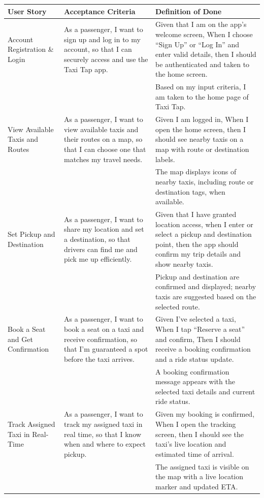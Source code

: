 \documentclass[a4paper,12pt]{article}
\begin{document}
\begin{longtable}{|p{4cm}|p{6cm}|p{5cm}|}
\hline
\textbf{User Story} & \textbf{Acceptance Criteria} & \textbf{Definition of Done} \\
\hline
Account Registration \& Login & As a passenger, I want to sign up and log in to my account, so that I can securely access and use the Taxi Tap app. & Given that I am on the app’s welcome screen, When I choose “Sign Up” or “Log In” and enter valid details, then I should be authenticated and taken to the home screen. \\
& & Based on my input criteria, I am taken to the home page of Taxi Tap. \\
\hline
View Available Taxis and Routes & As a passenger, I want to view available taxis and their routes on a map, so that I can choose one that matches my travel needs. & Given I am logged in, When I open the home screen, then I should see nearby taxis on a map with route or destination labels. \\
& & The map displays icons of nearby taxis, including route or destination tags, when available. \\
\hline
Set Pickup and Destination & As a passenger, I want to share my location and set a destination, so that drivers can find me and pick me up efficiently. & Given that I have granted location access, when I enter or select a pickup and destination point, then the app should confirm my trip details and show nearby taxis. \\
& & Pickup and destination are confirmed and displayed; nearby taxis are suggested based on the selected route. \\
\hline
Book a Seat and Get Confirmation & As a passenger, I want to book a seat on a taxi and receive confirmation, so that I’m guaranteed a spot before the taxi arrives. & Given I’ve selected a taxi, When I tap “Reserve a seat” and confirm, Then I should receive a booking confirmation and a ride status update. \\
& & A booking confirmation message appears with the selected taxi details and current ride status. \\
\hline
Track Assigned Taxi in Real-Time & As a passenger, I want to track my assigned taxi in real time, so that I know when and where to expect pickup. & Given my booking is confirmed, When I open the tracking screen, then I should see the taxi’s live location and estimated time of arrival. \\
& & The assigned taxi is visible on the map with a live location marker and updated ETA. \\

\end{longtable}
\end{document}
